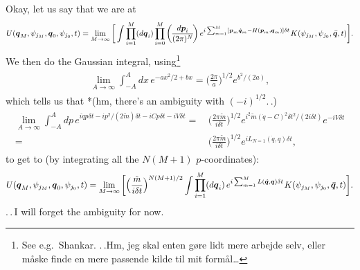 \documentclass{report}
\newcommand{\bsacc}[3]{#1{\boldsymbol{#2}\hspace{#3em}}\hspace{-#3em}}
\newcommand{\dotbsq}{{\bsacc{\dot}{q}{.15}}}
\newcommand{\barbsq}{{\bsacc{\bar}{q}{.2}}}
\begin{document}
Okay, let us say that we are at 
\begin{align}
\begin{aligned}
	U(\boldsymbol{q}_M, \psi_{j_M}, \boldsymbol{q}_0, \psi_{j_0}, t) =
		\lim_{M\to \infty} \bigg[
			\int 
			\prod_{i=1}^{M} (d\boldsymbol{q}_i) 
			\prod_{i=0}^{M} \bigg(\hspace{-.1em}\frac{d\boldsymbol{p}_i}{(2\pi)^N}\!\bigg)\, 
			e^{i \sum_{m=1}^{M} [\hspace{.07em}%
					\boldsymbol{p}_m \dotbsq_m - 
					H(\boldsymbol{p}_m, \boldsymbol{q}_m)
				]%
				\delta t
			}
			\hspace{.07em}
			K(\psi_{j_M}, \psi_{j_0}, \barbsq, t)
		\bigg].
\end{aligned}
\end{align}
We then do the Gaussian integral, using\footnote{See e.g.\ Shankar. .\,.Hm, jeg skal enten gøre lidt mere arbejde selv, eller måske finde en mere passende kilde til mit formål\ldots}
\begin{align}
\begin{aligned}
	\lim_{A \to \infty}\int_{-A}^{A} dx\, e^{-ax^2/2 + b x} = 
		\Big(\frac{2\pi}{a}\Big)^{1/2} e^{b^2/(2a)},
\end{aligned}
\end{align}
which tells us that *(hm, there's an ambiguity with $(-i)^{1/2}$.\,.)
\begin{align}
\begin{aligned}
	\lim_{A \to \infty}\int_{-A}^{A} dp\, 
		e^{i\dot q p \delta t - i p^2 /(2 \tilde m) \delta t - i C p \delta t - i V \delta t} 
	=&\, 
		\Big(\frac{2\pi \tilde m}{i\delta t}\Big)^{1/2} 
			e^{i^2 \tilde m (\dot q - C)^2 \delta t^2/(2i\delta t)}
			e^{-i V \delta t}
	\\=&\, 
		\Big(\frac{2\pi\tilde m}{i\delta t}\Big)^{1/2} 
				e^{i L_{N=1}(\dot q, q) \delta t},
\end{aligned}
\end{align}
to get to (by integrating all the $N(M+1)$ $p$-coordinates):
\begin{align}
\begin{aligned}
	U(\boldsymbol{q}_M, \psi_{j_M}, \boldsymbol{q}_0, \psi_{j_0}, t) =
		\lim_{M\to \infty} \bigg[
			\Big(\frac{\tilde m}{i\delta t}\Big)^{N(M+1)/2}  
			\int 
			\prod_{i=1}^{M} (d\boldsymbol{q}_i)\,
			e^{i \sum_{m=1}^{M} 
				L(\dotbsq, \boldsymbol{q})
				\delta t
			}
			\hspace{.07em}
			K(\psi_{j_M}, \psi_{j_0}, \barbsq, t)
		\bigg].
\end{aligned}
\end{align}
.\,.\,I will forget the ambiguity for now. 
\end{document}
